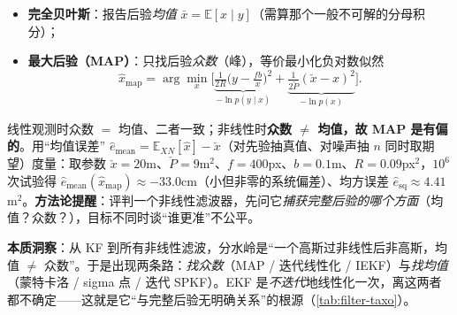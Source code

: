 \begin{itemize}
  \item \textbf{完全贝叶斯}：报告后验\emph{均值} $\bar{x}=\mathbb{E}[x\mid y]$（需算那个一般不可解的分母积分）；
  \item \textbf{最大后验（MAP）}：只找后验\emph{众数}（峰），等价最小化负对数似然
  \begin{equation}
    \hat{x}_{\text{map}}=\arg\min_x\Big[\underbrace{\tfrac{1}{2R}\big(y-\tfrac{fb}{x}\big)^2}_{-\ln p(y\mid x)}+\underbrace{\tfrac{1}{2\check{P}}(\check{x}-x)^2}_{-\ln p(x)}\Big].
    \label{eq:stereo-map}
  \end{equation}
\end{itemize}
线性观测时众数 $=$ 均值、二者一致；非线性时\textbf{众数 $\ne$ 均值，故 MAP 是有偏的}。用“均值误差” $\hat{e}_{\text{mean}}=\mathbb{E}_{XN}[\hat{x}]-\check{x}$（对先验抽真值、对噪声抽 $n$ 同时取期望）度量：取参数 $\check{x}=20$m、$\check{P}=9$m$^2$、$f=400$px、$b=0.1$m、$R=0.09$px$^2$，$10^6$ 次试验得 $\hat{e}_{\text{mean}}(\hat{x}_{\text{map}})\approx-33.0$cm（小但非零的系统偏差）、均方误差 $\hat{e}_{\text{sq}}\approx4.41$m$^2$\cite{barfoot2024state}。\textbf{方法论提醒}：评判一个非线性滤波器，先问它\emph{捕获完整后验的哪个方面}（均值？众数？），目标不同时谈“谁更准”不公平。

\begin{insight}
\textbf{本质洞察}：从 KF 到所有非线性滤波，分水岭是“一个高斯过非线性后非高斯，均值 $\ne$ 众数”。于是出现两条路：\emph{找众数}（MAP / 迭代线性化 / IEKF）与\emph{找均值}（蒙特卡洛 / sigma 点 / 迭代 SPKF）。EKF 是\emph{不迭代}地线性化一次，离这两者都不确定——这就是它“与完整后验无明确关系”的根源（\cref{tab:filter-taxo}）。
\end{insight}

